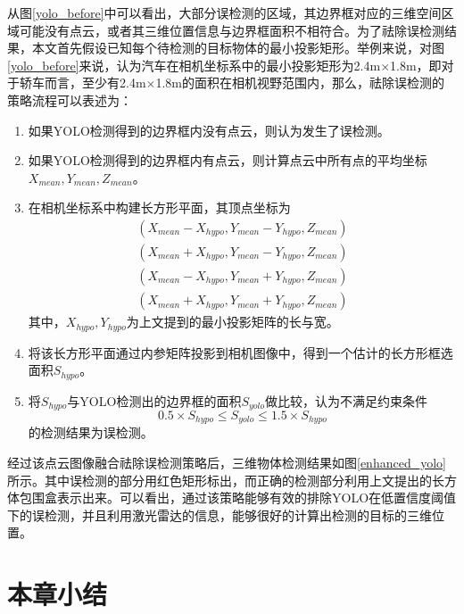 从图\ref{yolo_before}中可以看出，大部分误检测的区域，其边界框对应的三维空间区域可能没有点云，或者其三维位置信息与边界框面积不相符合。为了祛除误检测结果，本文首先假设已知每个待检测的目标物体的最小投影矩形。举例来说，对图\ref{yolo_before}来说，认为汽车在相机坐标系中的最小投影矩形为2.4m$\times$1.8m，即对于轿车而言，至少有2.4m$\times$1.8m的面积在相机视野范围内，那么，祛除误检测的策略流程可以表述为：
\begin{enumerate}
    \item 如果YOLO检测得到的边界框内没有点云，则认为发生了误检测。
    \item 如果YOLO检测得到的边界框内有点云，则计算点云中所有点的平均坐标 $X_{mean}, Y_{mean}, Z_{mean}$。
    \item 在相机坐标系中构建长方形平面，其顶点坐标为
    \begin{equation}
        \begin{split}
    (X_{mean} - X_{hypo}, Y_{mean}-Y_{hypo}, Z_{mean}) \\
    (X_{mean} + X_{hypo}, Y_{mean}-Y_{hypo}, Z_{mean}) \\
    (X_{mean} - X_{hypo}, Y_{mean}+Y_{hypo}, Z_{mean}) \\
    (X_{mean} + X_{hypo}, Y_{mean}+Y_{hypo}, Z_{mean})
        \end{split}
    \end{equation}
    其中，$X_{hypo}, Y_{hypo}$为上文提到的最小投影矩阵的长与宽。
    \item 将该长方形平面通过内参矩阵投影到相机图像中，得到一个估计的长方形框选面积$S_{hypo}$。
    \item 将$S_{hypo}$与YOLO检测出的边界框的面积$S_{yolo}$做比较，认为不满足约束条件    
    \begin{equation}
        0.5 \times S_{hypo} \leq S_{yolo} \leq 1.5 \times S_{hypo} 
    \end{equation}
    的检测结果为误检测。
\end{enumerate}

经过该点云图像融合祛除误检测策略后，三维物体检测结果如图\ref{enhanced_yolo}所示。其中误检测的部分用红色矩形标出，而正确的检测部分利用上文提出的长方体包围盒表示出来。可以看出，通过该策略能够有效的排除YOLO在低置信度阈值下的误检测，并且利用激光雷达的信息，能够很好的计算出检测的目标的三维位置。




\section{本章小结}